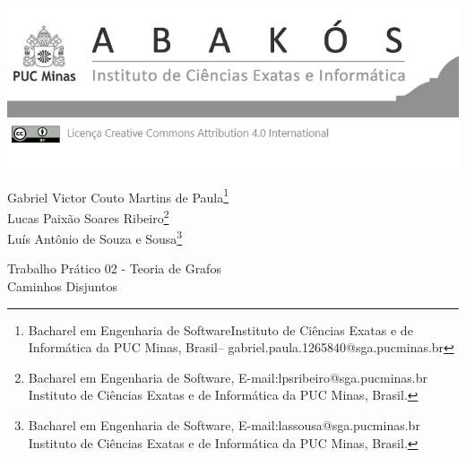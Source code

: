 \documentclass[a4paper,12pt,Times]{article}
\makeatletter
\newcommand{\origem}{Brasil}
\newcommand{\AutorA}{Gabriel Victor Couto Martins de Paula}
\newcommand{\funcaoA}{Bacharel em Engenharia de Software}
\newcommand{\emailA}{gabriel.paula.1265840@sga.pucminas.br}
\newcommand{\cursA}{Instituto de Ciências Exatas e de Informática da PUC Minas}
\newcommand{\AutorB}{Lucas Paixão Soares Ribeiro}
\newcommand{\funcaoB}{Bacharel em Engenharia de Software}
\newcommand{\emailB}{lpsribeiro@sga.pucminas.br}
\newcommand{\cursB}{Instituto de Ciências Exatas e de Informática da PUC Minas}
\newcommand{\AutorC}{Luís Antônio de Souza e Sousa}
\newcommand{\funcaoC}{Bacharel em Engenharia de Software}
\newcommand{\emailC}{lassousa@sga.pucminas.br}
\newcommand{\cursC}{Instituto de Ciências Exatas e de Informática da PUC Minas}
\makeatother
\begin{document}

\begin{flushleft}

\begin{minipage} [c][5cm][b]{16.5cm} %
\includegraphics[scale=1.1]{figuras/pucmg.png} 
\end{minipage}

\end{flushleft}
\begin{flushright}
\singlespacing 
\normalsize{\AutorA \footnote{\funcaoA \cursA, \origem -- \emailA }} \\
 \normalsize{\AutorB \footnote{\funcaoB, E-mail:\emailB \\ \cursB, \origem. }} \\
 \normalsize{\AutorC \footnote{\funcaoC, E-mail:\emailC \\ \cursC, \origem. }} \\
\end{flushright}
\thispagestyle{empty}

\vspace{2cm}

\begin{center}
    \centering
       	\huge{Trabalho Prático 02 - Teoria de Grafos}\\
       	\Large{Caminhos Disjuntos}
\end{center}


\newpage 

 \onehalfspace  %
 \setlength{\parindent}{1.25cm}





\end{document}
